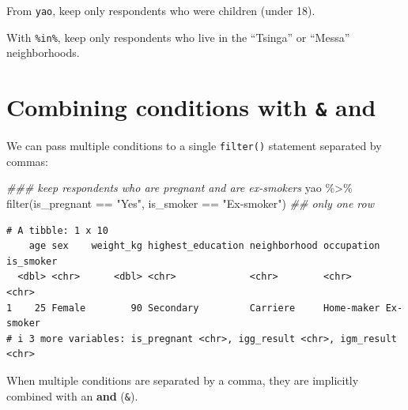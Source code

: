 \documentclass[
  letterpaper,
  DIV=11,
  numbers=noendperiod]{scrreprt}
\newenvironment{Shaded}{\begin{snugshade}}{\end{snugshade}}
\newcommand{\DocumentationTok}[1]{\textcolor[rgb]{0.37,0.37,0.37}{\textit{#1}}}
\newcommand{\FunctionTok}[1]{\textcolor[rgb]{0.28,0.35,0.67}{#1}}
\newcommand{\NormalTok}[1]{\textcolor[rgb]{0.00,0.23,0.31}{#1}}
\newcommand{\SpecialCharTok}[1]{\textcolor[rgb]{0.37,0.37,0.37}{#1}}
\newcommand{\StringTok}[1]{\textcolor[rgb]{0.13,0.47,0.30}{#1}}
\begin{document}
\begin{tcolorbox}[enhanced jigsaw, titlerule=0mm, colback=white, left=2mm, breakable, opacitybacktitle=0.6, colbacktitle=quarto-callout-tip-color!10!white, colframe=quarto-callout-tip-color-frame, bottomtitle=1mm, opacityback=0, coltitle=black, arc=.35mm, toptitle=1mm, title=\textcolor{quarto-callout-tip-color}{\faLightbulb}\hspace{0.5em}{Practice}, leftrule=.75mm, toprule=.15mm, bottomrule=.15mm, rightrule=.15mm]

From \texttt{yao}, keep only respondents who were children (under 18).

With \texttt{\%in\%}, keep only respondents who live in the ``Tsinga''
or ``Messa'' neighborhoods.

\end{tcolorbox}

\section{\texorpdfstring{Combining conditions with \texttt{\&} and
\texttt{\textbar{}}}{Combining conditions with \& and \textbar{}}}\label{combining-conditions-with-and}

We can pass multiple conditions to a single \texttt{filter()} statement
separated by commas:

\begin{Shaded}
\begin{Highlighting}[]
\DocumentationTok{\#\#\# keep respondents who are pregnant and are ex{-}smokers}
\NormalTok{yao }\SpecialCharTok{\%\textgreater{}\%} \FunctionTok{filter}\NormalTok{(is\_pregnant }\SpecialCharTok{==} \StringTok{"Yes"}\NormalTok{, is\_smoker }\SpecialCharTok{==} \StringTok{"Ex{-}smoker"}\NormalTok{) }\DocumentationTok{\#\# only one row}
\end{Highlighting}
\end{Shaded}

\begin{verbatim}
# A tibble: 1 x 10
    age sex    weight_kg highest_education neighborhood occupation is_smoker
  <dbl> <chr>      <dbl> <chr>             <chr>        <chr>      <chr>    
1    25 Female        90 Secondary         Carriere     Home-maker Ex-smoker
# i 3 more variables: is_pregnant <chr>, igg_result <chr>, igm_result <chr>
\end{verbatim}

When multiple conditions are separated by a comma, they are implicitly
combined with an \textbf{and} (\texttt{\&}).
\end{document}
